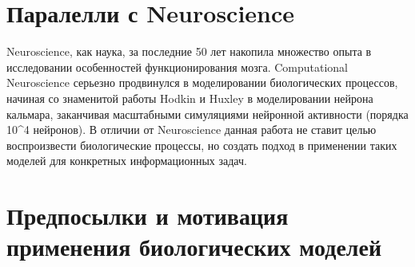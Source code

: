 \documentclass[a4paper,10pt]{article}
\begin{document}
\section*{Паралелли с Neuroscience}
\indent
\indent Neuroscience, как наука, за последние 50 лет накопила множество опыта в исследовании особенностей функционирования мозга. Computational Neuroscience серьезно продвинулся в моделировании биологических процессов, начиная со знаменитой работы Hodkin и Huxley в моделировании нейрона кальмара, заканчивая масштабными симуляциями нейронной активности (порядка 10^4 нейронов).
\indent В отличии от Neuroscience данная работа не ставит целью воспроизвести биологические процессы, но создать подход в применении таких моделей для конкретных информационных задач.

\section*{Предпосылки и мотивация применения биологических моделей}
\end{document}
